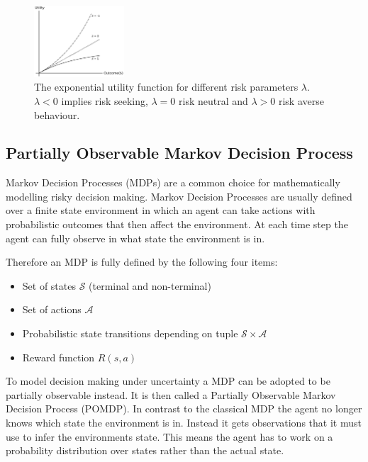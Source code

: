 \begin{figure}[ht]
\centering
\includegraphics[width=0.3\textwidth]{img/background/Exponential_Utility_Function.pdf}%
\caption{ 
The exponential utility function for different risk parameters $\lambda$. $\lambda < 0$ implies risk seeking, $\lambda = 0 $ risk neutral and $\lambda > 0 $ risk averse behaviour.
}
\label{fig:background:exponential}
\end{figure}





\subsection{Partially Observable Markov Decision Process}

Markov Decision Processes (MDPs) are a common choice for mathematically modelling risky decision making. Markov Decision Processes are usually defined over a finite state environment in which an agent can take actions with probabilistic outcomes that then affect the environment. At each time step the agent can fully observe in what state the environment is in.

Therefore an MDP is fully defined by the following four items:
\begin{itemize}
    \item Set of states $\mathcal{S}$ (terminal and non-terminal)
    \item Set of actions $\mathcal{A}$
    \item Probabilistic state transitions depending on tuple $\mathcal{S} \times \mathcal{A}$
    \item Reward function $R(s,a)$
\end{itemize}

To model decision making under uncertainty a MDP can be adopted to be partially observable instead. It is then called a Partially Observable Markov Decision Process (POMDP). In contrast to the classical MDP the agent no longer knows which state the environment is in. Instead it gets observations that it must use to infer the environments state.
This means the agent has to work on a probability distribution over states rather than the actual state.

